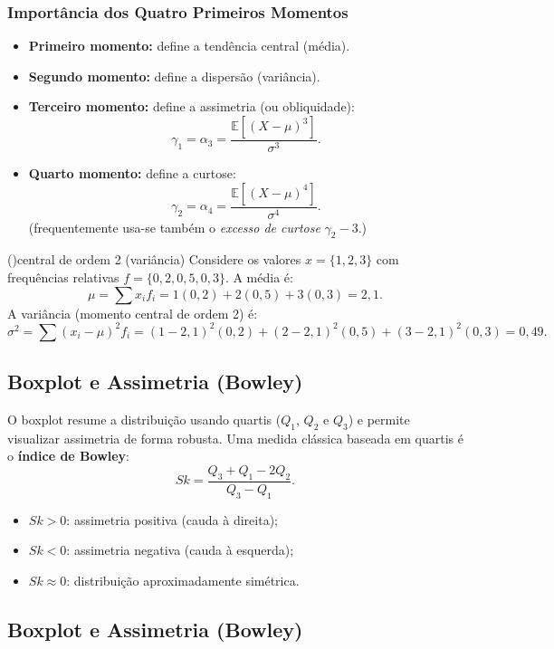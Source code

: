 \subsubsection*{Importância dos Quatro Primeiros Momentos}

\begin{itemize}
    \item \textbf{Primeiro momento:} define a tendência central (média).
    \item \textbf{Segundo momento:} define a dispersão (variância).
    \item \textbf{Terceiro momento:} define a assimetria (ou obliquidade):
    \[
    \gamma_1=\alpha_3=\frac{\mathbb{E}[(X-\mu)^3]}{\sigma^3}.
    \]
    \item \textbf{Quarto momento:} define a curtose:
    \[
    \gamma_2=\alpha_4=\frac{\mathbb{E}[(X-\mu)^4]}{\sigma^4}.
    \]
    (frequentemente usa-se também o \textit{excesso de curtose} $\gamma_2-3$.)
\end{itemize}

\begin{example}[Momen]()central de ordem 2 (variância)
Considere os valores $x=\{1,2,3\}$ com frequências relativas $f=\{0{,}2,0{,}5,0{,}3\}$.  
A média é:
\[
\mu=\sum x_i f_i = 1(0{,}2)+2(0{,}5)+3(0{,}3)=2{,}1.
\]
A variância (momento central de ordem 2) é:
\[
\sigma^2=\sum (x_i-\mu)^2 f_i
=(1-2{,}1)^2(0{,}2)+(2-2{,}1)^2(0{,}5)+(3-2{,}1)^2(0{,}3)=0{,}49.
\]
\end{example}

\subsection{Boxplot e Assimetria (Bowley)}

O boxplot resume a distribuição usando quartis ($Q_1$, $Q_2$ e $Q_3$) e permite visualizar assimetria de forma robusta. Uma medida clássica baseada em quartis é o \textbf{índice de Bowley}:
\[
Sk=\frac{Q_3+Q_1-2Q_2}{Q_3-Q_1}.
\]
\begin{itemize}
  \item $Sk>0$: assimetria positiva (cauda à direita);
  \item $Sk<0$: assimetria negativa (cauda à esquerda);
  \item $Sk\approx 0$: distribuição aproximadamente simétrica.
\end{itemize}

\subsection{Boxplot e Assimetria (Bowley)}

